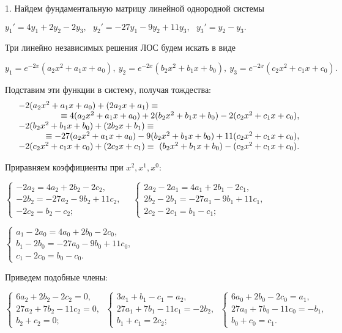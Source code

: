 \documentclass[11pt]{article}
\begin{document}
\smallskip
{\small
1. Найдем фундаментальную матрицу линейной однородной системы

\smallskip
$y_1'=4y_1+2y_2-2y_3,\ \ \ y_2'=-27y_1-9y_2+11y_3,\ \ \ y_3'=y_2-y_3.$

\smallskip
Три  линейно независимых решения ЛОС будем искать в виде

\smallskip
$y_1=e^{-2x}(a_2x^2+a_1x+a_0),\ y_2=e^{-2x}(b_2x^2+b_1x+b_0),\ y_3=e^{-2x}(c_2x^2+c_1x+c_0).$

\smallskip
Подставим эти функции в систему, получая тождества:
$$\begin{matrix}
-2(a_2x^2+a_1x+a_0)+(2a_2x+a_1)\equiv\hfill\\
\hfill \equiv 4(a_2x^2+a_1x+a_0)+2(b_2x^2+b_1x+b_0)-2(c_2x^2+c_1x+c_0),\\
-2(b_2x^2+b_1x+b_0)+(2b_2x+b_1)\equiv\hfill\\
\hfill \equiv -27(a_2x^2+a_1x+a_0)-9(b_2x^2+b_1x+b_0)+11(c_2x^2+c_1x+c_0),\\
-2(c_2x^2+c_1x+c_0)+(2c_2x+c_1)\equiv\ (b_2x^2+b_1x+b_0)-(c_2x^2+c_1x+c_0).
\end{matrix}$$

Приравняем коэффициенты при $x^2,x^1,x^0:$

\smallskip
$\begin{cases}-2a_2=4a_2+2b_2-2c_2,\\ -2b_2=-27a_2-9b_2+11c_2,\\ -2c_2=b_2-c_2;\end{cases}\quad
\begin{cases}2a_2-2a_1=4a_1+2b_1-2c_1,\\ 2b_2-2b_1=-27a_1-9b_1+11c_1,\\ 2c_2-2c_1=b_1-c_1;\end{cases}$

$\begin{cases}a_1-2a_0=4a_0+2b_0-2c_0,\\ b_1-2b_0=-27a_0-9b_0+11c_0,\\ c_1-2c_0=b_0-c_0.\end{cases}$

\smallskip
Приведем подобные члены:

\smallskip
$\begin{cases}6a_2+2b_2-2c_2=0,\\ 27a_2+7b_2-11c_2=0,\\ b_2+c_2=0;\end{cases}\
\begin{cases}3a_1+b_1-c_1=a_2,\\ 27a_1+7b_1-11c_1=-2b_2,\\ b_1+c_1=2c_2;\end{cases}\
\begin{cases}6a_0+2b_0-2c_0=a_1,\\ 27a_0+7b_0-11c_0=-b_1,\\ b_0+c_0=c_1.\end{cases}$

}
\end{document}
